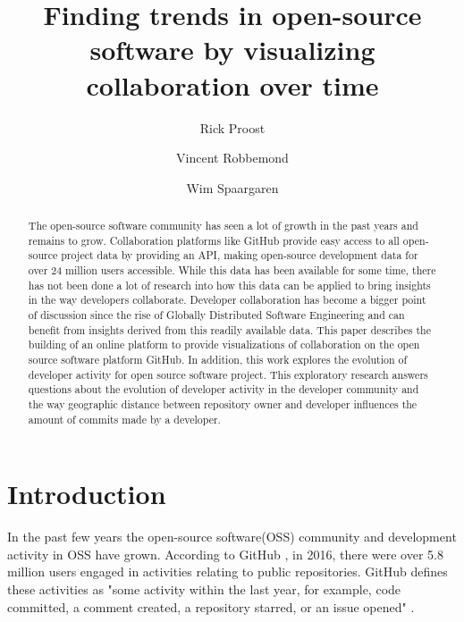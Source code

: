 \documentclass[acmtog, authorversion]{acmart}
\begin{document}
\title{Finding trends in open-source software by visualizing collaboration over time}

\author{Rick Proost}

\author{Vincent Robbemond}

\author{Wim Spaargaren}

\begin{abstract}
The open-source software community has seen a lot of growth in the past years and remains to grow.
Collaboration platforms like GitHub provide easy access to all open-source project data by providing an API, making open-source development data for over 24 million users accessible.
While this data has been available for some time, there has not been done a lot of research into how this data can be applied to bring insights in the way developers collaborate.
Developer collaboration has become a bigger point of discussion since the rise of Globally Distributed Software Engineering and can benefit from insights derived from this readily available data.
This paper describes the building of an online platform to provide visualizations of collaboration on the open source software platform GitHub.
In addition, this work explores the evolution of developer activity for open source software project.
This exploratory research answers questions about the evolution of developer activity in the developer community and the way geographic distance between repository owner and developer influences the amount of commits made by a developer.
\end{abstract}


\maketitle

\section{Introduction}
In the past few years the open-source software(OSS) community and development activity in OSS have grown.
According to GitHub \cite{GHOctoverse}, in 2016, there were over 5.8 million users engaged in activities relating to public repositories.
GitHub defines these activities as "some activity within the last year, for example, code committed, a comment created, a repository starred, or an issue opened" \cite{GHOctoverse}.
\end{document}
